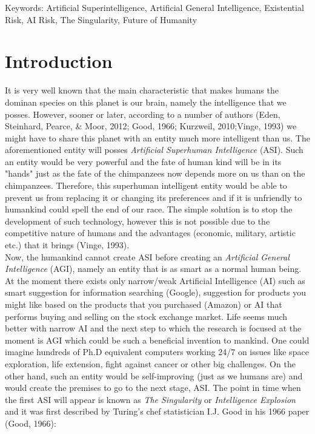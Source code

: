 \documentclass[11pt]{article}
\begin{document}
Keywords: Artificial Superintelligence, Artificial General Intelligence, Existential Risk, AI Risk, The Singularity, Future of Humanity

\section*{Introduction}
	It is very well known that the main characteristic that makes humans the dominan species on this planet is our brain, namely the intelligence that we posses. However, sooner or later, according to a number of authors (Eden, Steinhard, Pearce, \& Moor, 2012;  Good, 1966; Kurzweil, 2010;Vinge, 1993)  we might have to share this planet with an entity  much more intelligent than us. The aforementioned entity will posses \textit{Artificial Superhuman Intelligence} (ASI). Such an entity would be very powerful and the fate of human kind will be in its "hands" just as the fate of the chimpanzees now depends more on us than on the chimpanzees. Therefore, this superhuman intelligent entity would be able to prevent us from replacing it or changing its preferences and if it is unfriendly to humankind could spell the end of our race. The simple solution is to stop the development of such technology, however this is not possible due to the competitive nature of humans and the advantages (economic, military, artistic etc.) that it brings (Vinge, 1993). \\
	
	\indent
	Now, the humankind cannot create ASI before creating an \textit{Artificial General Intelligence} (AGI), namely  an entity that is as smart as a normal human being. At the moment there exists only narrow/weak Artificial Intelligence (AI) such as smart suggestion for information searching (Google), suggestion for products you might like based on the products that you purchased (Amazon) or AI that performs buying and selling on the stock exchange market. Life seems much better with narrow AI and the next step to which the research is focused at the moment is AGI which could be such a beneficial invention to mankind. One could imagine hundreds of Ph.D equivalent computers working 24/7 on issues like space exploration, life extension, fight against cancer or other big challenges. On the other hand, such an entity would be self-improving (just as we humans are) and would create the premises to go to the next stage, ASI. The point in time when the first ASI will appear is known as \textit {The Singularity} or \textit{Intelligence Explosion}  and it was first described by Turing's chef statistician I.J. Good in his 1966 paper (Good, 1966):
\end{document}
